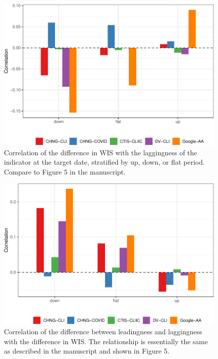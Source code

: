 \documentclass[9pt,twoside,lineno]{pnas-new}
\begin{document}
\clearpage

\begin{figure}

{\centering \includegraphics[width=\textwidth]{fig/lagging-only-1} 

}

\caption{Correlation of the difference in WIS with the laggingness of the indicator at the target date, stratified by up, down, or flat period. Compare to Figure 5 in the manuscript.}\label{fig:lagging-only}
\end{figure}

\clearpage

\begin{figure}

{\centering \includegraphics[width=\textwidth]{fig/diff-in-lead-lag-1} 

}

\caption{Correlation of the difference between leadingness and laggingness with the difference in WIS. The relationship is essentially the same as described in the manuscript and shown in Figure 5.}\label{fig:diff-in-lead-lag}
\end{figure}
\end{document}
